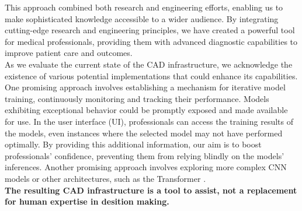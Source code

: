 This approach combined both research and engineering efforts, enabling us to
make sophisticated knowledge accessible to a wider audience. By integrating
cutting-edge research and engineering principles, we have created a powerful
tool for medical professionals, providing them with advanced diagnostic
capabilities to improve patient care and outcomes. \\

As we evaluate the current state of the CAD infrastructure, we acknowledge the
existence of various potential implementations that could enhance its
capabilities. One promising approach involves establishing a mechanism for
iterative model training, continuously monitoring and tracking their
performance. Models exhibiting exceptional behavior could be promptly exposed
and made available for use. In the user interface (UI), professionals can
access the training results of the models, even instances where the selected
model may not have performed optimally. By providing this additional
information, our aim is to boost professionals' confidence, preventing them
from relying blindly on the models' inferences. Another promising approach
involves exploring more complex CNN models or other architectures, such as the
Transformer \cite{Transformer}. \\

{\bf The resulting CAD infrastructure is a tool to assist, not a replacement for
human expertise in desition making.}
